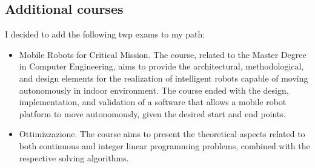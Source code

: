 \subsection{Additional courses}
I decided to add the following twp exams to my path:
\begin{itemize}
    \item Mobile Robots for Critical Mission. The course, related to the Master Degree in Computer Engineering, aims to provide the architectural, methodological, and design elements for the realization of intelligent robots capable of moving autonomously in indoor environment. The course ended with the design, implementation, and validation of a software that allows a mobile robot platform to move autonomously, given the desired start and end points.
    \item Ottimizzazione. The course aims to present the theoretical aspects related to both continuous and integer linear programming problems, combined with the respective solving algorithms.
\end{itemize}